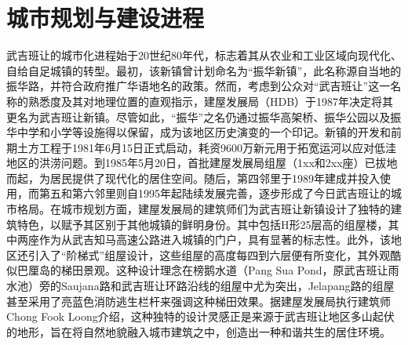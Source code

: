 \documentclass[11pt,a4paper,twoside,openany]{book}
\begin{document}
\section{城市规划与建设进程}
武吉班让的城市化进程始于20世纪80年代，标志着其从农业和工业区域向现代化、自给自足城镇的转型。最初，该新镇曾计划命名为“振华新镇”，此名称源自当地的振华路，并符合政府推广华语地名的政策。然而，考虑到公众对“武吉班让”这一名称的熟悉度及其对地理位置的直观指示，建屋发展局（HDB）于1987年决定将其更名为武吉班让新镇。尽管如此，“振华”之名仍通过振华高架桥、振华公园以及振华中学和小学等设施得以保留，成为该地区历史演变的一个印记。新镇的开发和前期土方工程于1981年6月15日正式启动，耗资9600万新元用于拓宽运河以应对低洼地区的洪涝问题。到1985年5月20日，首批建屋发展局组屋（1xx和2xx座）已拔地而起，为居民提供了现代化的居住空间。随后，第四邻里于1989年建成并投入使用，而第五和第六邻里则自1995年起陆续发展完善，逐步形成了今日武吉班让的城市格局。在城市规划方面，建屋发展局的建筑师们为武吉班让新镇设计了独特的建筑特色，以赋予其区别于其他城镇的鲜明身份。其中包括H形25层高的组屋楼，其中两座作为从武吉知马高速公路进入城镇的门户，具有显著的标志性。此外，该地区还引入了“阶梯式”组屋设计，这些组屋的高度每四到六层便有所变化，其外观酷似巴厘岛的梯田景观。这种设计理念在榜鹅水道（Pang Sua Pond，原武吉班让雨水池）旁的Saujana路和武吉班让环路沿线的组屋中尤为突出，Jelapang路的组屋甚至采用了亮蓝色消防逃生栏杆来强调这种梯田效果。据建屋发展局执行建筑师Chong Fook Loong介绍，这种独特的设计灵感正是来源于武吉班让地区多山起伏的地形，旨在将自然地貌融入城市建筑之中，创造出一种和谐共生的居住环境。
\end{document}

